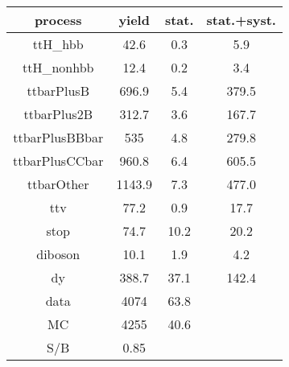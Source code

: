 \begin{tabular}{cccc}
\hline
    process     &  yield  &  stat.  &  stat.+syst.  \\
\hline
    ttH\_hbb     &  42.6   &   0.3   &      5.9      \\
   ttH\_nonhbb   &  12.4   &   0.2   &      3.4      \\
   ttbarPlusB   &  696.9  &   5.4   &     379.5     \\
  ttbarPlus2B   &  312.7  &   3.6   &     167.7     \\
 ttbarPlusBBbar &   535   &   4.8   &     279.8     \\
 ttbarPlusCCbar &  960.8  &   6.4   &     605.5     \\
   ttbarOther   & 1143.9  &   7.3   &     477.0     \\
      ttv       &  77.2   &   0.9   &     17.7      \\
      stop      &  74.7   &  10.2   &     20.2      \\
    diboson     &  10.1   &   1.9   &      4.2      \\
       dy       &  388.7  &  37.1   &     142.4     \\
      data      &  4074   &  63.8   &               \\
       MC       &  4255   &  40.6   &               \\
      S/B       &  0.85   &         &               \\
\hline
\end{tabular}